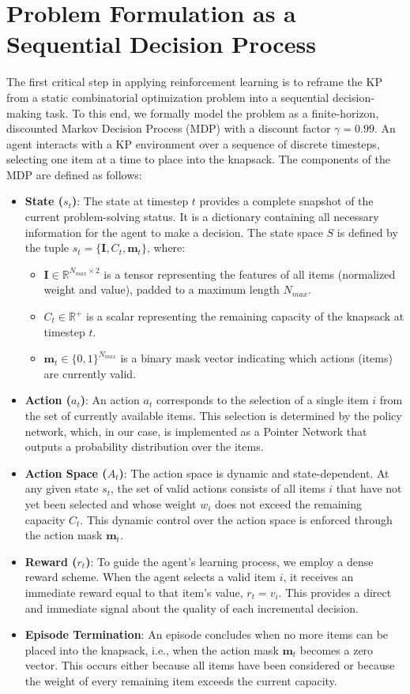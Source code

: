 \section{Problem Formulation as a Sequential Decision Process}
The first critical step in applying reinforcement learning is to reframe the KP from a static combinatorial optimization problem into a sequential decision-making task.
To this end, we formally model the problem as a finite-horizon, discounted Markov Decision Process (MDP) with a discount factor $\gamma = 0.99$.
An agent interacts with a KP environment over a sequence of discrete timesteps, selecting one item at a time to place into the knapsack.
The components of the MDP are defined as follows:
\begin{itemize}
    \item \textbf{State (\(s_t\))}: The state at timestep \(t\) provides a complete snapshot of the current problem-solving status. It is a dictionary containing all necessary information for the agent to make a decision. The state space \(S\) is defined by the tuple \(s_t = \{ \mathbf{I}, C_t, \mathbf{m}_t \}\), where:
    \begin{itemize}
        \item \(\mathbf{I} \in \mathbb{R}^{N_{max} \times 2}\) is a tensor representing the features of all items (normalized weight and value), padded to a maximum length \(N_{max}\).
        \item \(C_t \in \mathbb{R}^+\) is a scalar representing the remaining capacity of the knapsack at timestep \(t\).
        \item \(\mathbf{m}_t \in \{0, 1\}^{N_{max}}\) is a binary mask vector indicating which actions (items) are currently valid.
    \end{itemize}
    \item \textbf{Action (\(a_t\))}: An action \(a_t\) corresponds to the selection of a single item \(i\) from the set of currently available items.
    This selection is determined by the policy network, which, in our case, is implemented as a Pointer Network that outputs a probability distribution over the items.
    \item \textbf{Action Space (\(A_t\))}: The action space is dynamic and state-dependent.
    At any given state \(s_t\), the set of valid actions consists of all items \(i\) that have not yet been selected and whose weight \(w_i\) does not exceed the remaining capacity \(C_t\).
    This dynamic control over the action space is enforced through the action mask \(\mathbf{m}_t\).
    \item \textbf{Reward (\(r_t\))}: To guide the agent's learning process, we employ a dense reward scheme.
    When the agent selects a valid item \(i\), it receives an immediate reward equal to that item's value, \(r_t = v_i\).
    This provides a direct and immediate signal about the quality of each incremental decision.
    \item \textbf{Episode Termination}: An episode concludes when no more items can be placed into the knapsack, i.e., when the action mask \(\mathbf{m}_t\) becomes a zero vector. This occurs either because all items have been considered or because the weight of every remaining item exceeds the current capacity.
\end{itemize}
